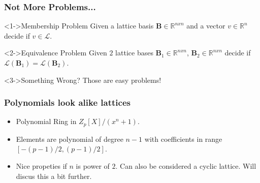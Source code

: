 \documentclass{beamer}
\begin{document}
\begin{frame}
    \frametitle{Not More Problems...}

    \begin{block}<1->{Membership Problem}
        Given a lattice basis $\mathbf{B} \in \mathbb{R}^{nxn}$ and a vector $v \in \mathbb{R}^n$ decide if $v \in \mathcal{L}$.
    \end{block}

    \begin{block}<2->{Equivalence Problem}
        Given $2$ lattice bases $\mathbf{B}_1 \in \mathbb{R}^{nxn}$, $\mathbf{B}_2 \in \mathbb{R}^{nxn}$ decide if $\mathcal{L}(\mathbf{B}_1) = \mathcal{L}(\mathbf{B}_2)$.
    \end{block}

    \begin{block}<3->{Something Wrong?}
        \pause \pause \pause Those are easy problems!
    \end{block}
\end{frame}

\begin{frame}
    \frametitle{Polynomials look alike lattices}
    \begin{itemize}
        \item Polynomial Ring in $Z_p[X] / (x ^ n + 1)$.
        \item Elements are polynomial of degree $n - 1$ with coefficients in range $[-(p-1)/2, (p-1)/2]$.
        \item Nice propeties if $n$ is power of $2$. Can also be considered a cyclic lattice. Will discus this a bit further.
    \end{itemize}
\end{frame}
\end{document}

